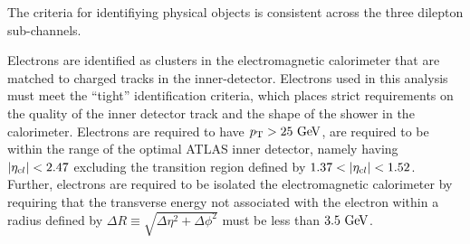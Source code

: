 The criteria for identifiying physical objects is consistent across the three dilepton sub-channels.

Electrons are identified as clusters in the electromagnetic calorimeter
that are matched to charged tracks in the inner-detector.
Electrons used in this analysis must meet the ``tight'' identification criteria,
which places strict requirements on the quality of the inner detector track and the
shape of the shower in the calorimeter.
Electrons are required to have $\pt>25\GeV$, are required to be within the range of the
optimal ATLAS inner detector, namely having $|\eta_{\text cl}|<2.47$ excluding the
transition region defined by $1.37<|\eta_{\text cl}|<1.52$.
Further, electrons are required to be isolated the electromagnetic calorimeter
by requiring that the transverse energy not associated with the electron within 
a radius defined by $\Delta R\equiv\sqrt{\Delta\eta^2 + \Delta\phi^2}$ must be less than $3.5\GeV$.





